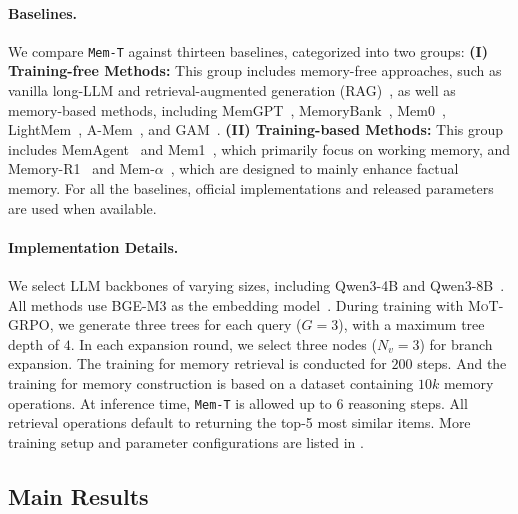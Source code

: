 \documentclass[11pt, a4paper]{lumia}
\newcommand{\ourmethod}{{\texttt{Mem-T}}\xspace} %
\newcommand{\ourtrain}{{\textsc{MoT-GRPO}}\xspace} %
\begin{document}
\paragraph{Baselines.} We compare \ourmethod against thirteen baselines, categorized into two groups: \textbf{(I) Training-free Methods:} This group includes memory-free approaches, such as vanilla long-LLM and retrieval-augmented generation (RAG)~\citep{DBLP:conf/nips/RAG2020}, as well as memory-based methods, including MemGPT~\citep{packer2023memgpt}, MemoryBank~\citep{zhong2023memorybankenhancinglargelanguage}, Mem0~\citep{Chhikara2025mem0}, LightMem~\citep{fang2025lightmem}, A-Mem~\citep{xuAMEMAgenticMemory2025}, and GAM~\citep{yanGeneralAgenticMemory2025}. \textbf{(II) Training-based Methods:} This group includes MemAgent~\citep{yu2025memagent} and Mem1~\citep{zhou2025mem1learningsynergizememory}, which primarily focus on working memory, and Memory-R1~\citep{yan2025memory} and Mem-$\alpha$~\citep{DBLP:journals/corr/abs-2509-25911}, which are designed to mainly enhance factual memory. For all the baselines, official implementations and released parameters are used when available.

\paragraph{Implementation Details.} We select LLM backbones of varying sizes, including Qwen3-4B and Qwen3-8B~\citep{yang2025Qwen3technicalreport}. All methods use BGE-M3 as the embedding model~\citep{chen2025m3embedding}.
During training with \ourtrain, we generate three trees for each query ($G=3$), with a maximum tree depth of $4$. In each expansion round, we select three nodes ($N_v=3$) for branch expansion. The training for memory retrieval is conducted for $200$ steps. And the training for memory construction is based on a dataset containing $10k$ memory operations. 
At inference time, \ourmethod is allowed up to $6$ reasoning steps. All retrieval operations default to returning the top-5 most similar items. 
More training setup and parameter configurations are listed in .

\subsection{Main Results}
\end{document}

